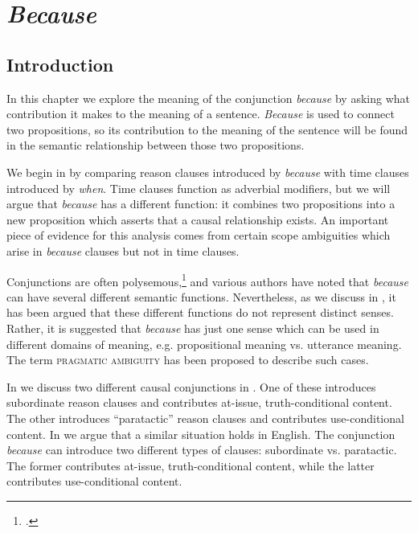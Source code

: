 \chapter{\textit{Because}}\label{sec:18}

\section{Introduction}\label{sec:18.1}

In this chapter we explore the meaning of the conjunction \textit{because} by asking what contribution it makes to the meaning of a sentence. \textit{Because} is used to connect two propositions, so its contribution to the meaning of the sentence will be found in the semantic relationship between those two propositions.



We begin in  by comparing reason clauses introduced by \textit{because} with time clauses introduced by \textit{when}. Time clauses function as adverbial modifiers, but we will argue that \textit{because} has a different function: it combines two propositions into a new proposition which asserts that a causal relationship exists. An important piece of evidence for this analysis comes from certain scope ambiguities which arise in \textit{because} clauses but not in time clauses.



Conjunctions are often polysemous,\footnote{\citet{Aikhenvald2009}.} and various authors have noted that \textit{because} can have several different semantic functions. Nevertheless, as we discuss in , it has been argued that these different functions do not represent distinct senses. Rather, it is suggested that \textit{because} has just one sense which can be used in different domains of meaning, e.g. propositional meaning vs. utterance meaning. The term \textsc{pragmatic ambiguity} has been proposed to describe such cases.


In  we discuss two different causal conjunctions in . One of these introduces subordinate reason clauses and contributes at-issue, truth-conditional content. The other introduces “paratactic” reason clauses and contributes use-conditional content. In  we argue that a similar situation holds in English. The conjunction \textit{because} can introduce two different types of clauses: subordinate vs. paratactic. The former contributes at-issue, truth-conditional content, while the latter contributes use-conditional content.


